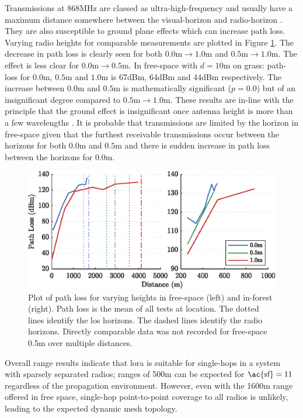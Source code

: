 Transmissions at 868MHz are classed as ultra-high-frequency and usually have a maximum distance somewhere between the visual-horizon and radio-horizon \cite{3YP:ANTENNA_BOOK}. They are also susceptible to ground plane effects which can increase path loss. Varying radio heights for comparable measurements are plotted in Figure \ref{fig:height_pl_plot}. The decrease in path loss is clearly seen for both $0.0\text{m}\rightarrow 1.0\text{m} $ and $0.5\text{m}\rightarrow 1.0\text{m}$. The effect is less clear for $0.0\text{m}\rightarrow 0.5\text{m}$. In free-space with $d=10\text{m}$ on grass: path-loss for $0.0\text{m}$, $0.5\text{m}$ and $1.0\text{m}$ is 67dBm, 64dBm and 44dBm respectively. The increase between $0.0\text{m}$ and $0.5\text{m}$ is mathematically significant ($p=0.0$) but of an insignificant degree compared to $0.5\text{m}\rightarrow 1.0\text{m}$. These results are in-line with the principle that the ground effect is insignificant once antenna height is more than a few wavelengths \cite{3YP:ANTENNA_BOOK}. It is probable that transmissions are limited by the horizon in free-space given that the furthest receivable transmissions occur between the horizons for both $0.0\text{m}$ and $0.5\text{m}$ and there is sudden increase in path loss between the horizons for $0.0\text{m}$.

\begin{figure}[H]
    \centering
   	\includegraphics{Figures/height_pl_plot}
    \caption[Effect of Antenna Height on Path Loss]{
		Plot of path loss for varying heights in free-space (left) and in-forest (right). Path loss is the mean of all tests at location. The dotted lines identify the \ac{los} horizons. The dashed lines identify the radio horizons. Directly comparable data was not recorded for free-space 0.5m over multiple distances.
    }
    \label{fig:height_pl_plot}
\end{figure}

Overall range results indicate that \ac{lora} is suitable for single-hops in a system with sparsely separated radios; ranges of 500m can be expected for $\text{\ac{sf}}=11$ regardless of the propagation environment. However, even with the 1600m range offered in free space, single-hop point-to-point coverage to all radios is unlikely, leading to the expected dynamic mesh topology.

